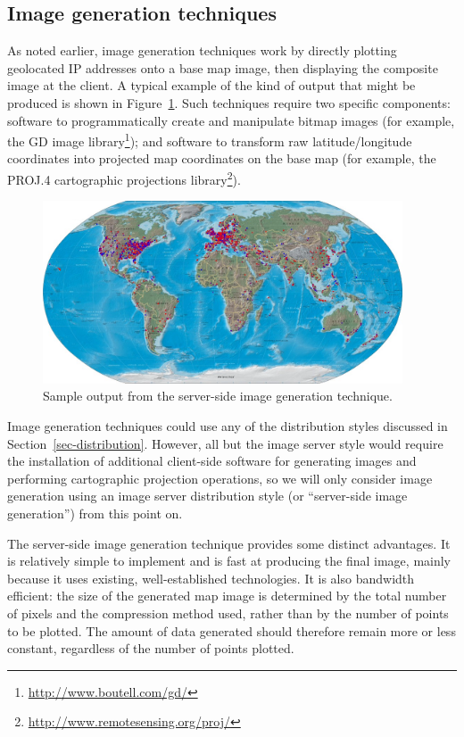 \documentclass[acmtocl,acmnow]{acmtrans2m}
\begin{document}
\subsection{Image generation techniques}
\label{sec-image-gen}

As noted earlier, image generation techniques work by directly plotting
geolocated IP addresses onto a base map image, then displaying the
composite image at the client. A typical example of the kind of output
that might be produced is shown in Figure~\ref{fig-image}. Such
techniques require two specific components: software to programmatically
create and manipulate bitmap images (for example, the GD image
library\footnote{\url{http://www.boutell.com/gd/}}); and software to
transform raw latitude/longitude coordinates into projected map
coordinates on the base map (for example, the PROJ.4 cartographic
projections library\footnote{\url{http://www.remotesensing.org/proj/}}).


\begin{figure}
	\begin{center}
		\includegraphics[width=0.95\textwidth,keepaspectratio]{ImageGeneration-full}
	\end{center}
	\caption{Sample output from the server-side image generation technique.}
	\label{fig-image}
\end{figure}


Image generation techniques could use any of the distribution styles
discussed in Section~\ref{sec-distribution}. However, all but the image
server style would require the installation of additional client-side
software for generating images and performing cartographic projection
operations, so we will only consider image generation using an image
server distribution style (or ``server-side image generation'') from
this point on.

The server-side image generation technique provides some distinct
advantages. It is relatively simple to implement and is fast at
producing the final image, mainly because it uses existing,
well-established technologies. It is also bandwidth efficient: the size
of the generated map image is determined by the total number of pixels
and the compression method used, rather than by the number of points to
be plotted. The amount of data generated should therefore remain more or
less constant, regardless of the number of points plotted.
\end{document}

